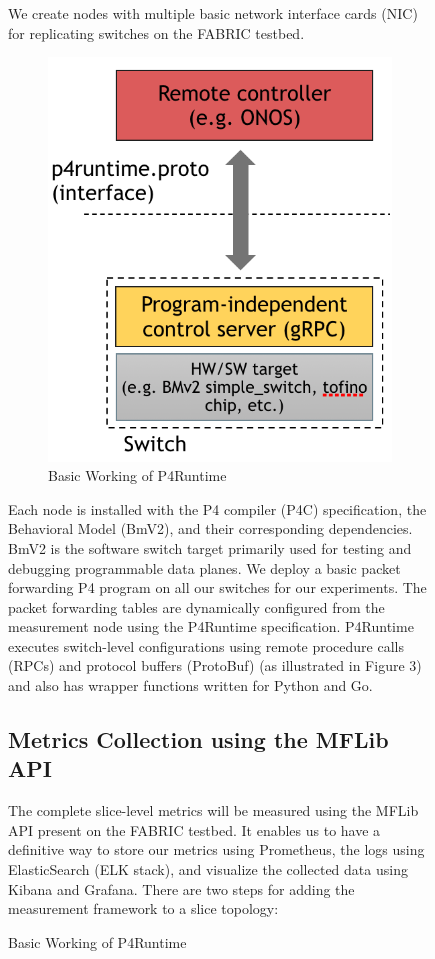 \documentclass[conference]{IEEEtran}
\begin{document}
\begin{figure}[h!]
     We create nodes with multiple basic network interface cards (NIC) for replicating switches on the FABRIC testbed.  
    \begin{figure}[h!]
            \includegraphics[scale=0.21]{P4Runtime.png}
            \centering
            \caption{Basic Working of P4Runtime}
    \end{figure}
    Each node is installed with the P4 compiler (P4C) specification, the Behavioral Model (BmV2), and their corresponding dependencies. BmV2 is the software switch target primarily used for testing and debugging programmable data planes. We deploy a basic packet forwarding P4 program on all our switches for our experiments. The packet forwarding tables are dynamically configured from the measurement node using the P4Runtime specification. P4Runtime executes switch-level configurations using remote procedure calls (RPCs) and protocol buffers (ProtoBuf) (as illustrated in Figure 3) and also has wrapper functions written for Python and Go.
     

        \subsection{Metrics Collection using the MFLib API}
    The complete slice-level metrics will be measured using the MFLib API present on the FABRIC testbed. It enables us to have a definitive way to store our metrics using Prometheus, the logs using ElasticSearch (ELK stack), and visualize the collected data using Kibana and Grafana. There are two steps for adding the measurement framework to a slice topology: 
    

\end{figure}
\end{document}
